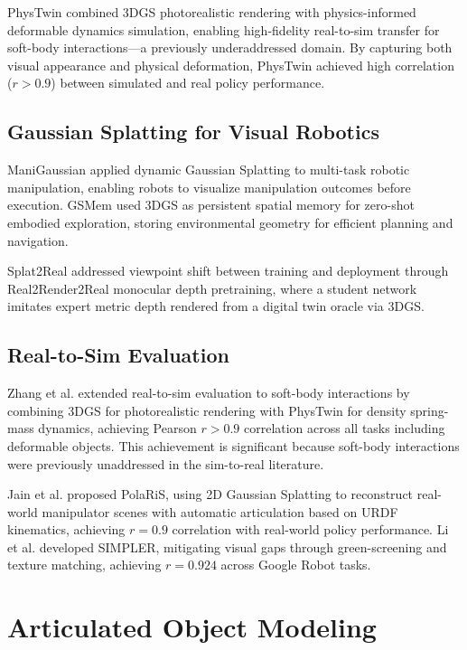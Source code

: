 \documentclass[journal]{IEEEtran}
\begin{document}
PhysTwin \cite{phystwin2025} combined 3DGS photorealistic rendering with physics-informed deformable dynamics simulation, enabling high-fidelity real-to-sim transfer for soft-body interactions---a previously underaddressed domain. By capturing both visual appearance and physical deformation, PhysTwin achieved high correlation ($r > 0.9$) between simulated and real policy performance.

\subsection{Gaussian Splatting for Visual Robotics}

ManiGaussian \cite{manigaussian2024} applied dynamic Gaussian Splatting to multi-task robotic manipulation, enabling robots to visualize manipulation outcomes before execution. GSMem \cite{gsmem2026} used 3DGS as persistent spatial memory for zero-shot embodied exploration, storing environmental geometry for efficient planning and navigation.

Splat2Real \cite{splat2real2025} addressed viewpoint shift between training and deployment through Real2Render2Real monocular depth pretraining, where a student network imitates expert metric depth rendered from a digital twin oracle via 3DGS.

\subsection{Real-to-Sim Evaluation}

Zhang et al. \cite{softviz2025} extended real-to-sim evaluation to soft-body interactions by combining 3DGS for photorealistic rendering with PhysTwin for density spring-mass dynamics, achieving Pearson $r > 0.9$ correlation across all tasks including deformable objects. This achievement is significant because soft-body interactions were previously unaddressed in the sim-to-real literature.

Jain et al. \cite{polaris2025} proposed PolaRiS, using 2D Gaussian Splatting to reconstruct real-world manipulator scenes with automatic articulation based on URDF kinematics, achieving $r = 0.9$ correlation with real-world policy performance. Li et al. \cite{simpler2024} developed SIMPLER, mitigating visual gaps through green-screening and texture matching, achieving $r = 0.924$ across Google Robot tasks.

\section{Articulated Object Modeling}
\end{document}
